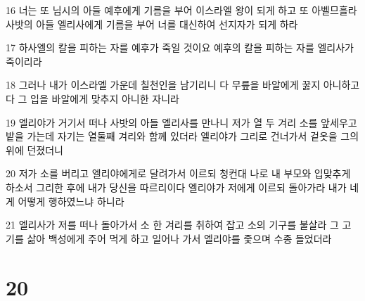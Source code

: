 \par 16 너는 또 님시의 아들 예후에게 기름을 부어 이스라엘 왕이 되게 하고 또 아벨므흘라 사밧의 아들 엘리사에게 기름을 부어 너를 대신하여 선지자가 되게 하라
\par 17 하사엘의 칼을 피하는 자를 예후가 죽일 것이요 예후의 칼을 피하는 자를 엘리사가 죽이리라
\par 18 그러나 내가 이스라엘 가운데 칠천인을 남기리니 다 무릎을 바알에게 꿇지 아니하고 다 그 입을 바알에게 맞추지 아니한 자니라
\par 19 엘리야가 거기서 떠나 사밧의 아들 엘리사를 만나니 저가 열 두 겨리 소를 앞세우고 밭을 가는데 자기는 열둘째 겨리와 함께 있더라 엘리야가 그리로 건너가서 겉옷을 그의 위에 던졌더니
\par 20 저가 소를 버리고 엘리야에게로 달려가서 이르되 청컨대 나로 내 부모와 입맞추게 하소서 그리한 후에 내가 당신을 따르리이다 엘리야가 저에게 이르되 돌아가라 내가 네게 어떻게 행하였느냐 하니라
\par 21 엘리사가 저를 떠나 돌아가서 소 한 겨리를 취하여 잡고 소의 기구를 불살라 그 고기를 삶아 백성에게 주어 먹게 하고 일어나 가서 엘리야를 좇으며 수종 들었더라

\chapter{20}

